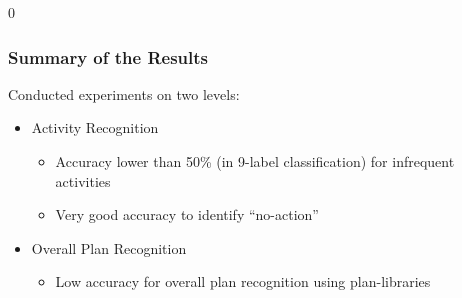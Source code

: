 \documentclass{beamer}
\def\masterclass{1}
\begin{document}

\if\masterclass0
\begin{frame}[c]\frametitle{Summary of the Results}
	Conducted experiments on two levels:
	\begin{itemize}
		\item Activity Recognition
		\begin{itemize}
			\item Accuracy lower than 50\% (in 9-label classification) for infrequent activities
			\item Very good accuracy to identify ``no-action''
		\end{itemize}
		\item Overall Plan Recognition
		\begin{itemize}
			\item Low accuracy for overall plan recognition using plan-libraries
		\end{itemize}
	\end{itemize}
\end{frame}
\fi
\end{document}
